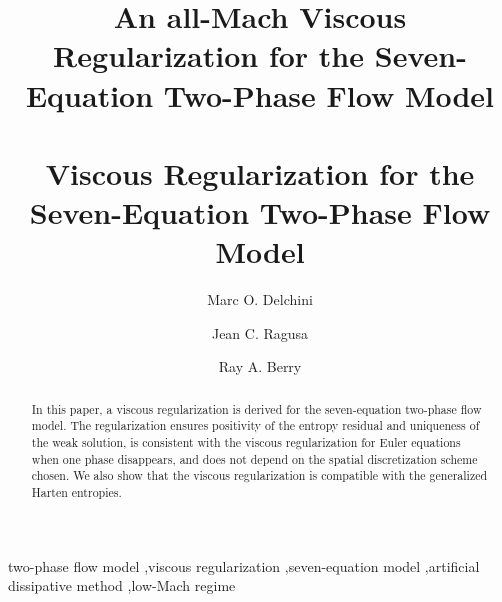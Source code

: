 \documentclass[preprint,10pt]{elsarticle}
\begin{document}
\begin{frontmatter}


\title{An all-Mach Viscous Regularization for the Seven-Equation Two-Phase Flow Model\\
\\
Viscous Regularization for the Seven-Equation Two-Phase Flow Model\\
}
\author{Marc O. Delchini}
%
\author{Jean C. Ragusa}
%
\author{Ray A. Berry}
%
\address[label1]{Department of Nuclear Engineering, Texas A\&M University, College Station, TX 77843, USA }
%
\address[label2]{Idaho National Laboratory, Idaho Falls, ID 83415, USA }
%
\begin{abstract}
In this paper, a viscous regularization is derived for the seven-equation two-phase flow model. The regularization ensures positivity of the entropy 
residual and uniqueness of the weak solution, %
is consistent with the viscous regularization for Euler equations when one phase disappears, and does not depend on the spatial discretization scheme 
chosen. We also show that the viscous regularization is compatible with the generalized Harten entropies.
\end{abstract}
\begin{keyword}
  two-phase flow model \sep viscous regularization \sep seven-equation model \sep artificial dissipative method \sep low-Mach regime  
\end{keyword}
\end{frontmatter}
%
\linenumbers
%
\end{document}
